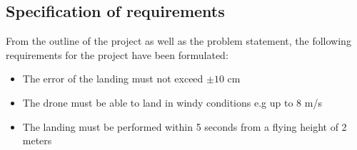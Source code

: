 \documentclass[../Head/Report.tex]{subfiles}
\begin{document}
\subsection{Specification of requirements}

From the outline of the project as well as the problem statement, the following requirements for the project have been formulated:

\begin{itemize}
    \item The error of the landing must not exceed $\pm 10$ cm  
    \item The drone must be able to land in windy conditions e.g up to 8 m/s
    \item The landing must be performed within 5 seconds from a flying height of 2 meters 

\end{itemize}
\end{document}
